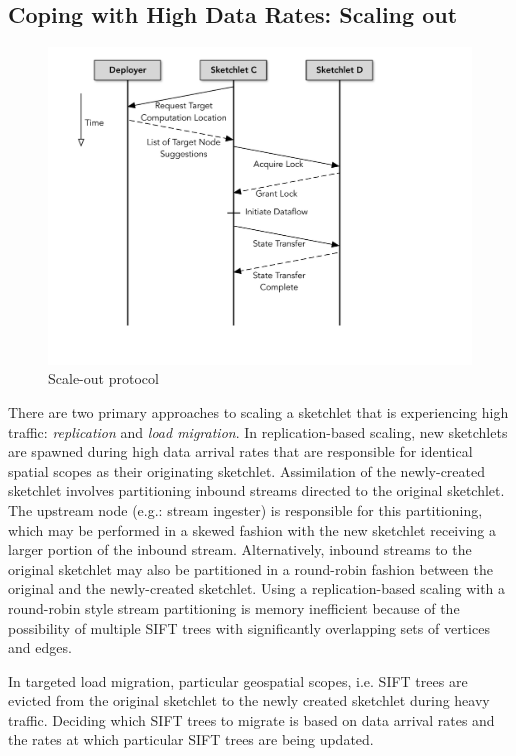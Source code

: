 \subsection{Coping with High Data Rates: Scaling out}
\label{subsec:scaling-out}
%
\begin{figure}[h!]
    \centering
    \includegraphics[scale=0.4, valign=t]{figures/scale-out.pdf}
    \caption{Scale-out protocol}
    \label{fig:scale-out-protocol}    
\end{figure}
There are two primary approaches to scaling a sketchlet that is experiencing high traffic: \emph{replication} and \emph{load migration}. In replication-based scaling, new sketchlets are spawned during high data arrival rates that are responsible for identical spatial scopes as their originating sketchlet. Assimilation of the newly-created sketchlet involves partitioning inbound streams directed to the original sketchlet. The upstream node (e.g.: stream ingester) is responsible for this partitioning, which may be performed in a skewed fashion with the new sketchlet receiving a larger portion of the inbound stream. Alternatively, inbound streams to the original sketchlet may also be partitioned in a round-robin fashion between the original and the newly-created sketchlet.
Using a replication-based scaling with a round-robin style stream partitioning is memory inefficient because of the possibility of multiple SIFT trees with significantly overlapping sets of vertices and edges.

In targeted load migration, particular geospatial scopes, i.e. SIFT trees are evicted from the original sketchlet to the newly created sketchlet during heavy traffic. Deciding which SIFT trees to migrate is based on data arrival rates and the rates at which particular SIFT trees are being updated.

